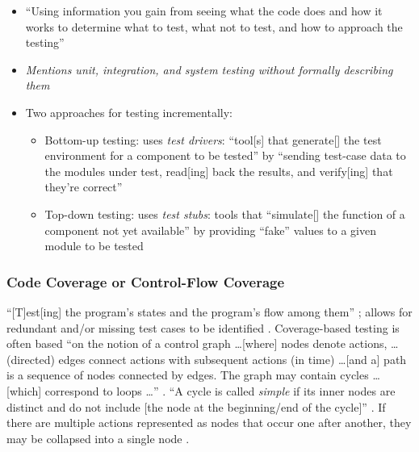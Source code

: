 \begin{itemize}
      \item ``Using information you gain from seeing what the code does and how
            it works to determine what to test, what not to test, and how to
            approach the testing'' \cite[p.~105]{patton_software_2006}
      \item \emph{Mentions unit, integration, and system testing without
                  formally describing them} \cite[p.~109]{patton_software_2006}
      \item Two approaches for testing incrementally:
            \begin{itemize}
                  \item Bottom-up testing: uses \emph{test drivers}: ``tool[s]
                        that generate[] the test environment for a component to
                        be tested'' \cite[p.~410]{van_vliet_software_2000} by
                        ``sending test-case data to the modules under test,
                        read[ing] back the results, and verify[ing] that
                        they're correct'' \cite[p.~109]{patton_software_2006}
                  \item Top-down testing: uses \emph{test stubs}: tools that
                        ``simulate[] the function of a component not yet
                        available'' \cite[p.~410]{van_vliet_software_2000} by
                        providing ``fake'' values to a given module to be
                        tested \cite[p.~110]{patton_software_2006}
            \end{itemize}
\end{itemize}

\subsubsection{Code Coverage \cite[pp.~117-121]{patton_software_2006} or
      Control-Flow Coverage \cite[pp.~421-424]{van_vliet_software_2000}}

``[T]est[ing] the program's states and the program's flow among them''
\cite[p.~117]{patton_software_2006}; allows for redundant and/or missing test
cases to be identified \cite[p.~118]{patton_software_2006}. Coverage-based
testing is often based ``on the notion of a control graph \dots [where]
nodes denote actions, \dots (directed) edges connect actions with
subsequent actions (in time) \dots [and a] path is a sequence of nodes
connected by edges. The graph may contain cycles \dots [which] correspond
to loops \dots'' \cite[pp.~420-421]{van_vliet_software_2000}. ``A cycle is
called \emph{simple} if its inner nodes are distinct and do not include
      [the node at the beginning/end of the cycle]''
\cite[p.~421, emphasis added]{van_vliet_software_2000}. If there are
multiple actions represented as nodes that occur one after another, they may
be collapsed into a single node \cite[p.~421]{van_vliet_software_2000}.

